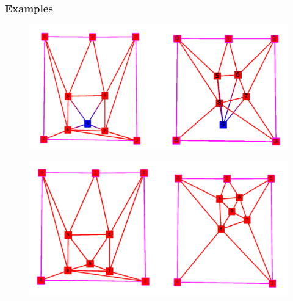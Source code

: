 \begin{frame}
\frametitle{Examples}
\begin{exampleblock}{}
\begin{figure}[!h]
\centering
\includegraphics[scale=0.2]{../rapport/img/bad_exemple.png}
\end{figure}
\end{exampleblock}{}
\pause
\begin{exampleblock}{}
\begin{figure}[!h]
\centering
\includegraphics[scale=0.2]{../rapport/img/bad_good.png}
\end{figure}
\end{exampleblock}{}
\end{frame}
